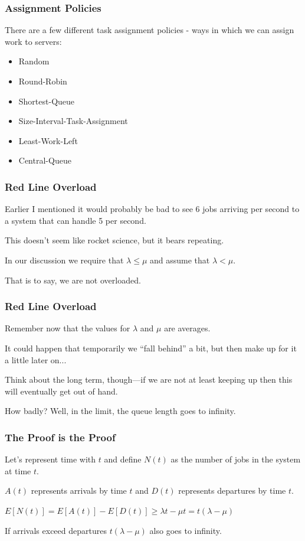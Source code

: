 \begin{frame}
\frametitle{Assignment Policies}

There are a few different task assignment policies - ways in which we can assign work to servers:

\begin{itemize}
	\item Random
	\item Round-Robin
	\item Shortest-Queue
	\item Size-Interval-Task-Assignment
	\item Least-Work-Left
	\item Central-Queue
\end{itemize}

\end{frame}



\begin{frame}
\frametitle{Red Line Overload}

Earlier I mentioned it would probably be bad to see 6 jobs arriving per second to a system that can handle 5 per second. 

This doesn't seem like rocket science, but it bears repeating. 

In our discussion we require that $\lambda \leq \mu$ and assume that $\lambda < \mu$. 

That is to say, we are not overloaded.

\end{frame}



\begin{frame}
\frametitle{Red Line Overload}

Remember now that the values for $\lambda$ and $\mu$ are averages. 

It could happen that temporarily we ``fall behind'' a bit, but then make up for it a little later on... 

Think about the long term, though---if we are not at least keeping up then this will eventually get out of hand. 

How badly? Well, in the limit, the queue length goes to infinity.

\end{frame}



\begin{frame}
\frametitle{The Proof is the Proof}

Let's represent time with $t$ and define $N(t)$ as the number of jobs in the system at time $t$.

$A(t)$ represents arrivals by time $t$ and $D(t)$ represents departures by time $t$.

\begin{center}
	$E[N(t)] = E[A(t)] - E[D(t)] \geq \lambda t - \mu t = t (\lambda - \mu) $
\end{center}

If arrivals exceed departures  $t (\lambda - \mu) $ also goes to infinity.

\end{frame}



